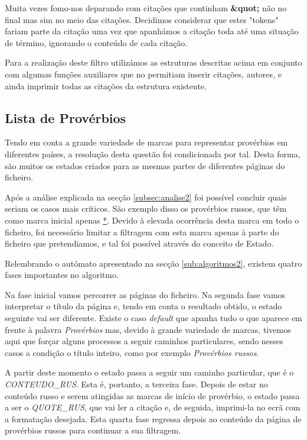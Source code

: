\documentclass[11pt,a4paper]{report}
\begin{document}
Muita vezes fomo-nos deparando com citações que continham \textbf{\&quot;} não no final mas sim no meio das citações. Decidimos considerar que estes "tokens"  fariam parte da citação uma vez que apanhámos a citação toda até uma situação de término, ignorando o conteúdo de cada citação.

Para a realização deste filtro utilizámos as estruturas descritas acima em conjunto com algumas funções auxiliares que no permitiam inserir citações, autores, e ainda imprimir todas as citações da estrutura existente.


\subsection{Lista de Provérbios}

Tendo em conta a grande variedade de marcas para representar provérbios em diferentes países, a resolução desta questão foi condicionada por tal. Desta forma, são muitos os estados criados para as mesmas partes de diferentes páginas do ficheiro.

Após a análise explicada na secção \ref{subsec:analise2} foi possível concluir quais seriam os casos mais críticos. São exemplo disso os provérbios russos, que têm como marca inicial apenas \underline{*}. Devido à elevada ocorrência desta marca em todo o ficheiro, foi necessário limitar a filtragem com esta marca apenas à parte do ficheiro que pretendiamos, e tal foi possível através do conceito de Estado.

Relembrando o autómato apresentado na secção \ref{sub:algoritmos2}, existem quatro fases importantes no algoritmo.

Na fase inicial vamos percorrer as páginas do ficheiro. Na segunda fase vamos interpretar o título da página e, tendo em conta o resultado obtido, o estado seguinte vai ser diferente. Existe o caso \textit{default} que apanha tudo o que aparece em frente à palavra \textit{Provérbios} mas, devido à grande variedade de marcas, tivemos aqui que forçar alguns processos a seguir caminhos particulares, sendo nesses casos a condição o título inteiro, como por exemplo \textit{Provérbios russos}.

A partir deste momento o estado passa a seguir um caminho particular, que é o \textit{CONTEUDO\_RUS}. Esta é, portanto, a terceira fase. Depois de estar no conteúdo russo e serem atingidas as marcas de início de provérbio, o estado passa a ser o \textit{QUOTE\_RUS}, que vai ler a citação e, de seguida, imprimi-la no ecrã com a formatação desejada. Esta quarta fase regressa depois ao conteúdo da página de provérbios russos para continuar a sua filtragem.
\end{document}
